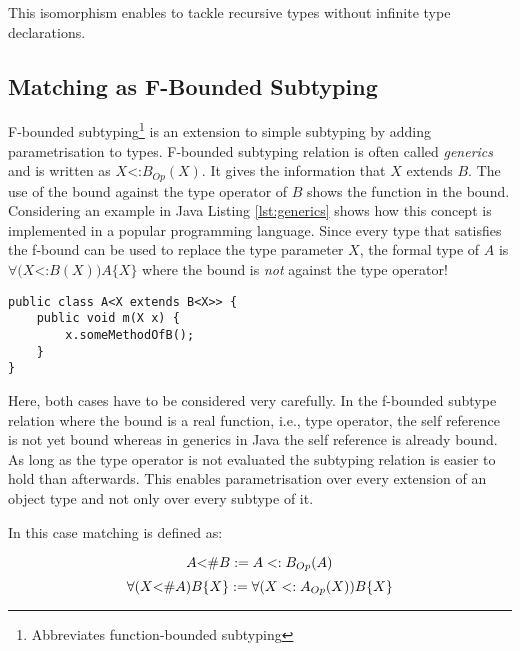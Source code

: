 This isomorphism enables to tackle recursive types without infinite type
declarations.

\subsection{Matching as F-Bounded Subtyping}
F-bounded subtyping\footnote{Abbreviates function-bounded subtyping}
is an extension to simple subtyping by adding parametrisation to
types. F-bounded subtyping relation is often called \emph{generics}
and is written as $X$<:$B_{Op}(X)$. It gives the information that $X$
extends $B$. The use of the bound against the type operator of $B$
shows the function in the bound. Considering an example in Java
Listing \ref{lst:generics} shows how this concept is implemented in a popular
programming language. Since every type that satisfies the f-bound can
be used to replace the type parameter $X$, the formal type of $A$ is
$\forall(X$<:$B(X))A\{X\}$ where the bound is \emph{not} against the
type operator!

\begin{lstlisting}[float=ht,caption={Universal quantified f-bound in Java},label={lst:generics}]
public class A<X extends B<X>> {
	public void m(X x) {
		x.someMethodOfB();
	}
}
\end{lstlisting}

Here, both cases have to be considered very carefully. In the f-bounded subtype
relation where the bound is a real function, i.e., type operator,
the self reference is not yet bound whereas in generics in Java the self
reference is already bound. As long as the type operator is not evaluated
the subtyping relation is easier to hold than afterwards. This enables
parametrisation over every extension of an object type and not only over
every subtype of it.

In this case matching is defined as\cite{abadi_subtyping_1996}:

\begin{defn}
	\label{def:matchingAsBound}
	\[A \textnormal{<\#} B := A <: B_{Op}(A)\]
	\[\forall (X \textnormal{<\#} A)B\{X\} := \forall (X <: A_{Op}(X))B\{X\}\]
\end{defn}

